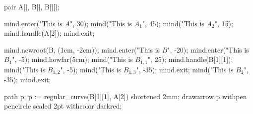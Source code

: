 \usemodule[mindmap]
\startMPpage
pair A[], B[], B[][];

mind.enter("This is $A$", 30);
    mind("This is $A_1$", 45);
    mind("This is $A_2$", 15); mind.handle(A[2]);
mind.exit;

mind.newroot(B, (1cm, -2cm));
mind.enter("This is $B$", -20);
    mind.enter("This is $B_{1}$", -5);
        mind.howfar(5cm);
        mind("This is $B_{1,1}$", 25); mind.handle(B[1][1]);
        mind("This is $B_{1,2}$", -5);
        mind("This is $B_{1,3}$", -35);
    mind.exit;
    mind("This is $B_2$", -35);
mind.exit;

path p; p := regular_curve(B[1][1], A[2]) shortened 2mm;
drawarrow p withpen pencircle scaled 2pt withcolor darkred;
\stopMPpage
